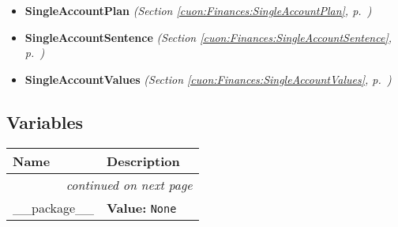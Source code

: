 \begin{itemize}
\item \textbf{SingleAccountPlan}
  \textit{(Section \ref{cuon:Finances:SingleAccountPlan}, p.~\pageref{cuon:Finances:SingleAccountPlan})}

\item \textbf{SingleAccountSentence}
  \textit{(Section \ref{cuon:Finances:SingleAccountSentence}, p.~\pageref{cuon:Finances:SingleAccountSentence})}

\item \textbf{SingleAccountValues}
  \textit{(Section \ref{cuon:Finances:SingleAccountValues}, p.~\pageref{cuon:Finances:SingleAccountValues})}

\end{itemize}



  \subsection{Variables}

    \vspace{-1cm}
\hspace{\varindent}\begin{longtable}{|p{\varnamewidth}|p{\vardescrwidth}|l}
\cline{1-2}
\cline{1-2} \centering \textbf{Name} & \centering \textbf{Description}& \\
\cline{1-2}
\endhead\cline{1-2}\multicolumn{3}{r}{\small\textit{continued on next page}}\\\endfoot\cline{1-2}
\endlastfoot\raggedright \_\-\_\-p\-a\-c\-k\-a\-g\-e\-\_\-\_\- & \raggedright \textbf{Value:} 
{\tt None}&\\
\cline{1-2}
\end{longtable}

